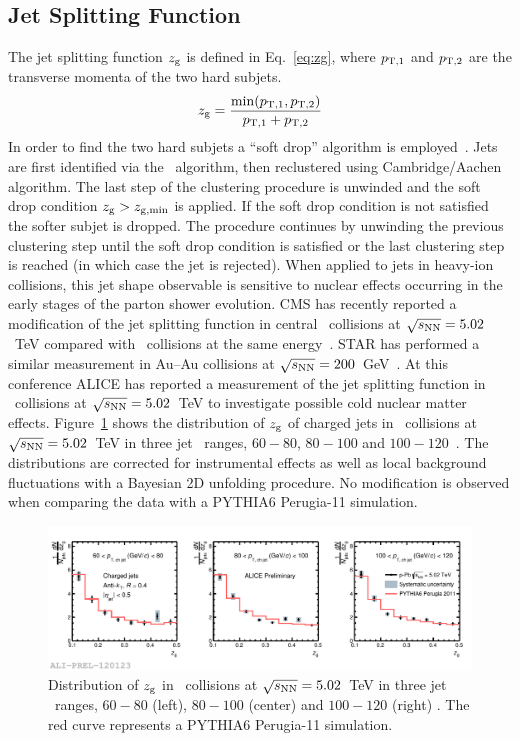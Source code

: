 \documentclass[10pt]{article}
\begin{document}
\subsection{Jet Splitting Function}
The jet splitting function $z_{\rm g}$ is defined in Eq.~\ref{eq:zg}, where $p_{\rm T,1}$ and $p_{\rm T,2}$ are the transverse momenta
of the two hard subjets.
\begin{equation}
z_{\rm g} = \frac{\min({p_{\rm T,1},p_{\rm T,2}})}{p_{\rm T,1}+p_{\rm T,2}}
\label{eq:zg}
\end{equation}
In order to find the two hard subjets a ``soft drop'' algorithm is employed~\cite{Larkoski:2014, Larkoski:2015}. Jets are first identified via the \antikt\ algorithm, then reclustered using Cambridge/Aachen algorithm.
The last step of the clustering procedure is unwinded and the soft drop condition $z_{\rm g} > z_{\rm g, min}$ is applied. If the soft drop condition is not satisfied the softer subjet is dropped.
The procedure continues by unwinding the previous clustering step until the soft drop condition is satisfied or the last clustering step is reached (in which case the jet is rejected).
When applied to jets in heavy-ion collisions, this jet shape observable is sensitive to nuclear effects occurring in the early stages of the parton shower evolution.
CMS has recently reported a modification of the jet splitting function in central \PbPb\ collisions at $\sqrt{s_{\rm NN}}=5.02$~TeV compared with
\pp\ collisions at the same energy~\cite{CMS:2017a}.
STAR has performed a similar measurement in Au--Au collisions at $\sqrt{s_{\rm NN}}=200$~GeV~\cite{Kauder:2017}.
At this conference ALICE has reported a measurement of the jet splitting function in \pPb\ collisions at $\sqrt{s_{\rm NN}}=5.02$~TeV to investigate possible cold nuclear matter effects.
Figure~\ref{fig:zgppb} shows the distribution of $z_{\rm g}$ of charged jets in \pPb\ collisions at $\sqrt{s_{\rm NN}}=5.02$~TeV in three jet \pt\ ranges, $60-80$, $80-100$ and $100-120$~\GeVc. 
The distributions are corrected for instrumental effects as well as local background fluctuations with a Bayesian 2D unfolding procedure.
No modification is observed when comparing the data with a PYTHIA6 Perugia-11 simulation.
\begin{figure}[tb]
\centering
\includegraphics[width=.85\textwidth]{img/2017-Feb-01-zg_unfolded_20GeV_ALL}
\caption{Distribution of $z_{\rm g}$ in \pPb\ collisions at $\sqrt{s_{\rm NN}}=5.02$~TeV in three jet \pt\ ranges, $60-80$ (left), $80-100$ (center) and $100-120$ (right) \GeVc.
The red curve represents a PYTHIA6 Perugia-11 simulation.}
\label{fig:zgppb}
\end{figure}
\end{document}
